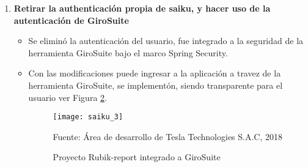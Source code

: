 \begin{spacing}{1.5}
\begin{enumerate}
\begin{itemize}
					\begin{figure}[H]
						\centering
						\texttt{[image: saiku\_2]}
						\caption {\centering \small{Proyecto Rubik-report, c\'{o}digo fuente}} \label{figure:chaperIII_5}
						\small {Fuente: \'{A}rea de desarrollo de Tesla Technologies S.A.C, 2018}
					\end{figure}
					
					\item El equipo recomienda reducir el n\'{u}mero de m\'{o}dulos pues 2 de ellos se encuentran ligados directamente como plugins de la Suite Pentaho Analytics.
					\item El equipo recomienda quitar todo aquello que no sea parte de la funcionalidad core y refactorizar el m\'{o}dulo rubik-query.
				\end{itemize}	
			
			\item \textbf{Retirar la authenticación propia de saiku, y hacer uso de la autenticación de GiroSuite}
				\begin{itemize}
					\item Se elimin\'{o} la autenticaci\'{o}n del usuario, fue integrado a la seguridad de la herramienta GiroSuite bajo el marco Spring Security.
					\item Con las modificaciones puede ingresar a la aplicaci\'{o}n a travez de la herramienta GiroSuite, se implement\'{o}n, siendo transparente para el usuario ver Figura \ref{figure:chaperIII_6}.
					\begin{figure}[H]
						\centering
						\texttt{[image: saiku\_3]}
						\caption {\centering \small{Proyecto Rubik-report integrado a GiroSuite}} \label{figure:chaperIII_6}
						\small {Fuente: \'{A}rea de desarrollo de Tesla Technologies S.A.C, 2018}
					\end{figure}
				\end{itemize}
			

\end{enumerate}
\end{spacing}

